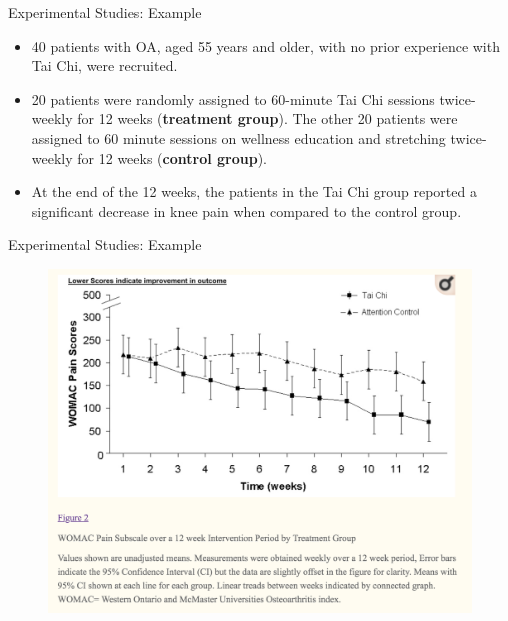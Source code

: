 \documentclass[10pt]{beamer}
\begin{document}
\begin{frame}{Experimental Studies: Example}
\vspace{-2cm} 
\begin{itemize}
\item 40 patients with OA, aged 55 years and older, with no prior experience with Tai Chi, were recruited.
\vspace{5pt}
\item 20 patients were randomly assigned to 60-minute Tai Chi sessions twice-weekly for 12 weeks (\textbf{treatment group}).  The other 20 patients were assigned to 60 minute sessions on wellness education and stretching twice-weekly for 12 weeks (\textbf{control group}).
\vspace{5pt}
\item At the end of the 12 weeks, the patients in the Tai Chi group reported a significant decrease in knee pain when compared to the control group.
\end{itemize}
\end{frame}



\begin{frame}{Experimental Studies: Example}
\begin{figure}
\includegraphics[scale=0.3]{figure/Pain12weeks.png}
\end{figure}
\end{frame}
\end{document}
